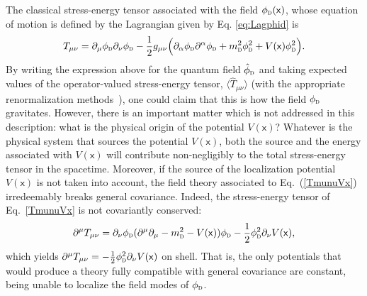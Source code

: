 \documentclass[letterpaper,12pt,titlepage,oneside,final]{book}
\newcommand{\mf}{\mathsf}%
\newcommand{\tc}[1]{\textsc{#1}}
\begin{document}
The classical stress-energy tensor associated with the field $\phi_\tc{d}(\mf x)$,  whose equation of motion is defined by the Lagrangian given by Eq. \eqref{eq:Lagphid} is
\begin{equation}\begin{aligned}
    T_{\mu\nu} = \partial_\mu \phi_{\tc{d}}\partial_\nu \phi_{\tc{d}}-\frac{1}{2}g_{\mu\nu}\Big(\partial_\alpha \phi_{\tc{d}}\partial^\alpha \phi_{\tc{d}} + m_{\tc{d}}^2 \phi_\tc{d}^2 + V(\mf x) \phi_\tc{d}^2\Big).
    \label{TmunuVx}
\end{aligned}\end{equation}
By writing the expression above for the quantum field $\hat{\phi}_\tc{d}$ and taking expected values of the operator-valued stress-energy tensor, $\langle \hat{T}_{\mu\nu}\rangle$ (with the appropriate renormalization methods~\cite{birrell_davies,HadamardRenormalization2008}){,} one could claim that this is how the field $\phi_\tc{d}$ gravitates. However, there is an important matter which is not addressed in this description: what is the physical origin of the potential $V(\mf x)$? Whatever is the physical system that sources the potential $V(\mf x)$, both the source and the energy associated with $V(\mf x)$ will contribute non-negligibly to the total stress-energy tensor in the spacetime. 
Moreover, if the source of the localization potential $V({\mf x})$ is not taken into account, the field theory associated to
Eq.~(\ref{TmunuVx}) irredeemably breaks general covariance. Indeed, the stress-energy tensor of Eq.~\eqref{TmunuVx} is not covariantly conserved:
\begin{equation}
    \partial^\mu T_{\mu\nu} = \partial_\nu \phi_\tc{d}(\partial^\mu \partial_\mu - m_\tc{d}^2 - V(\mf x))\phi_\tc{d} - \frac{1}{2}\phi_\tc{d}^2\partial_\nu V(\mf x),
\end{equation}
which yields $\partial^\mu T_{\mu\nu} = - \frac{1}{2}\phi_\tc{d}^2\partial_\nu V(\mf x)$ on shell. That is, the only potentials that would produce a theory fully compatible with general covariance are constant, being unable to localize the field modes of $\phi_\tc{d}$.
\end{document}

